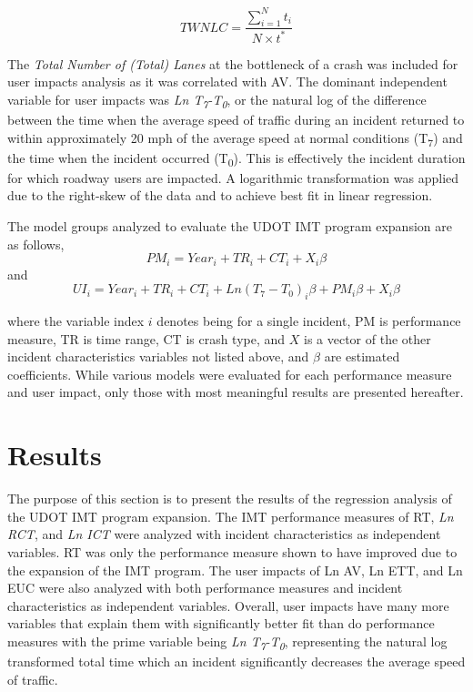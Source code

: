 \documentclass[
  letterpaper,
  authoryear]{elsarticle}
\begin{document}
\[ TWNLC = \frac{\sum_{i=1}^{N}t_i}{N \times t^*}
\]

The \emph{Total Number of (Total) Lanes} at the bottleneck of a crash
was included for user impacts analysis as it was correlated with AV. The
dominant independent variable for user impacts was \emph{Ln
T\textsubscript{7}-T\textsubscript{0}}, or the natural log of the
difference between the time when the average speed of traffic during an
incident returned to within approximately 20 mph of the average speed at
normal conditions (T\textsubscript{7}) and the time when the incident
occurred (T\textsubscript{0}). This is effectively the incident duration
for which roadway users are impacted. A logarithmic transformation was
applied due to the right-skew of the data and to achieve best fit in
linear regression.

The model groups analyzed to evaluate the UDOT IMT program expansion are
as follows, \[ 
{PM}_i = {Year}_i + {TR}_i + {CT}_i + X_i\beta
\] and \[ 
{UI}_i = {Year}_i + {TR}_i + {CT}_i + {Ln(T_7 -T_0)}_i\beta + {PM}_i\beta + X_i\beta
\]

where the variable index \(i\) denotes being for a single incident, PM
is performance measure, TR is time range, CT is crash type, and \(X\) is
a vector of the other incident characteristics variables not listed
above, and \(\beta\) are estimated coefficients. While various models
were evaluated for each performance measure and user impact, only those
with most meaningful results are presented hereafter.


\section{Results}\label{results}

The purpose of this section is to present the results of the regression
analysis of the UDOT IMT program expansion. The IMT performance measures
of RT, \emph{Ln RCT}, and \emph{Ln ICT} were analyzed with incident
characteristics as independent variables. RT was only the performance
measure shown to have improved due to the expansion of the IMT program.
The user impacts of Ln AV, Ln ETT, and Ln EUC were also analyzed with
both performance measures and incident characteristics as independent
variables. Overall, user impacts have many more variables that explain
them with significantly better fit than do performance measures with the
prime variable being \emph{Ln T\textsubscript{7}-T\textsubscript{0}},
representing the natural log transformed total time which an incident
significantly decreases the average speed of traffic.
\end{document}
